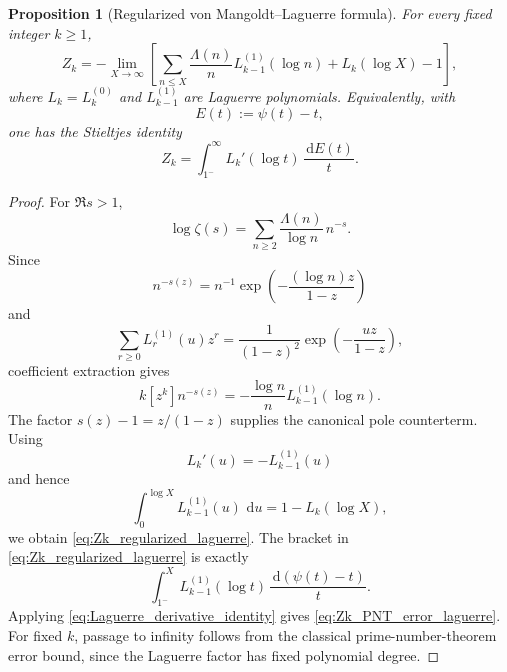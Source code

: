 \documentclass[11pt]{amsart}
\numberwithin{equation}{section}
\theoremstyle{plain}
\newtheorem{proposition}[theorem]{Proposition}
\theoremstyle{definition}
\theoremstyle{remark}
\newcommand{\dd}{\,\mathrm d}
\begin{document}
\begin{proposition}[Regularized von Mangoldt--Laguerre formula]
\label{prop:Zk_regularized_laguerre}
For every fixed integer $k\ge1$,
\begin{equation}
 Z_k
 =-\lim_{X\to\infty}
 \left[
 \sum_{n\le X}\frac{\Lambda(n)}{n}
 L_{k-1}^{(1)}(\log n)
 +L_k(\log X)-1
 \right],
 \label{eq:Zk_regularized_laguerre}
\end{equation}
where $L_k=L_k^{(0)}$ and $L_{k-1}^{(1)}$ are Laguerre polynomials.  Equivalently, with
\begin{equation}
 E(t):=\psi(t)-t,
 \label{eq:PNT_error_E}
\end{equation}
one has the Stieltjes identity
\begin{equation}
 \boxed{
 Z_k=\int_{1^-}^{\infty}
 L_k'(\log t)\,\frac{\dd E(t)}{t}.}
 \label{eq:Zk_PNT_error_laguerre}
\end{equation}
\end{proposition}

\begin{proof}
For $\Re s>1$,
\begin{equation}
 \log\zeta(s)=\sum_{n\ge2}\frac{\Lambda(n)}{\log n}\,n^{-s}.
 \label{eq:logzeta_von_mangoldt}
\end{equation}
Since
\begin{equation}
 n^{-s(z)}
 =n^{-1}\exp\!\left(-\frac{(\log n)z}{1-z}\right)
 \label{eq:n_minus_s_cayley}
\end{equation}
and
\begin{equation}
 \sum_{r\ge0}L_r^{(1)}(u)z^r
 =\frac{1}{(1-z)^2}\exp\!\left(-\frac{uz}{1-z}\right),
 \label{eq:Laguerre_gen_alpha1}
\end{equation}
coefficient extraction gives
\begin{equation}
 k[z^k]n^{-s(z)}
 =-\frac{\log n}{n}L_{k-1}^{(1)}(\log n).
 \label{eq:Laguerre_coefficient_n_minus_s}
\end{equation}
The factor $s(z)-1=z/(1-z)$ supplies the canonical pole counterterm.  Using
\begin{equation}
 L_k'(u)=-L_{k-1}^{(1)}(u)
 \label{eq:Laguerre_derivative_identity}
\end{equation}
and hence
\begin{equation}
 \int_0^{\log X}L_{k-1}^{(1)}(u)\,\dd u
 =1-L_k(\log X),
 \label{eq:Laguerre_counterterm_integral}
\end{equation}
we obtain \eqref{eq:Zk_regularized_laguerre}.  The bracket in \eqref{eq:Zk_regularized_laguerre} is exactly
\begin{equation}
 \int_{1^-}^{X}
 L_{k-1}^{(1)}(\log t)\,\frac{\dd(\psi(t)-t)}{t}.
\end{equation}
Applying \eqref{eq:Laguerre_derivative_identity} gives \eqref{eq:Zk_PNT_error_laguerre}.  For fixed $k$, passage to infinity follows from the classical prime-number-theorem error bound, since the Laguerre factor has fixed polynomial degree.
\end{proof}
\end{document}
